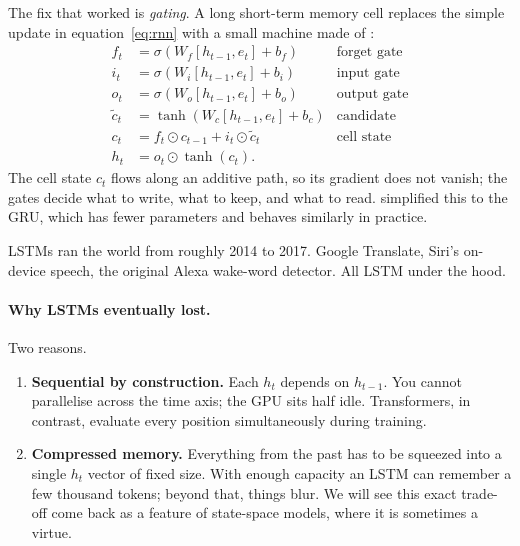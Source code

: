 The fix that worked is \emph{gating}. A long short-term memory cell
\citep{hochreiter1997lstm} replaces the simple update in
equation~\eqref{eq:rnn} with a small machine made of :
\begin{align}
  f_t &= \sigma(W_f [h_{t-1}, e_t] + b_f) & \text{forget gate} \\
  i_t &= \sigma(W_i [h_{t-1}, e_t] + b_i) & \text{input gate} \\
  o_t &= \sigma(W_o [h_{t-1}, e_t] + b_o) & \text{output gate} \\
  \tilde c_t &= \tanh(W_c [h_{t-1}, e_t] + b_c) & \text{candidate} \\
  c_t &= f_t \odot c_{t-1} + i_t \odot \tilde c_t & \text{cell state} \\
  h_t &= o_t \odot \tanh(c_t).
\end{align}
The cell state \(c_t\) flows along an additive path, so its gradient does
not vanish; the gates decide what to write, what to keep, and what to read.
\citet{cho2014gru} simplified this to the GRU, which has fewer parameters and
behaves similarly in practice.

LSTMs ran the world from roughly 2014 to 2017. Google Translate, Siri's
on-device speech, the original Alexa wake-word detector. All LSTM under
the hood.

\paragraph{Why LSTMs eventually lost.} Two reasons.

\begin{enumerate}
\item \textbf{Sequential by construction.} Each \(h_t\) depends on \(h_{t-1}\).
You cannot parallelise across the time axis; the GPU sits half idle.
Transformers, in contrast, evaluate every position simultaneously during
training.
\item \textbf{Compressed memory.} Everything from the past has to be squeezed
into a single \(h_t\) vector of fixed size. With enough capacity an LSTM
can remember a few thousand tokens; beyond that, things blur. We will see
this exact trade-off come back as a feature of state-space models, where it
is sometimes a virtue.
\end{enumerate}

